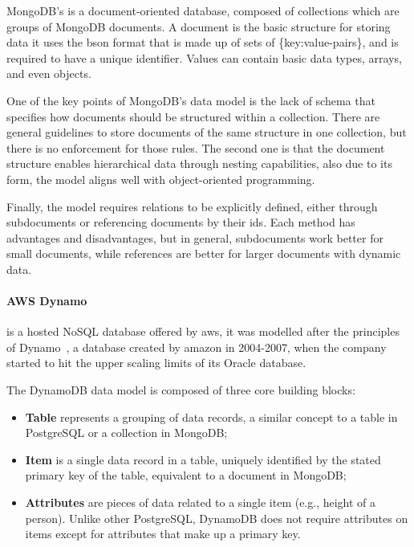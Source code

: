 MongoDB's is a document-oriented database, composed of collections which are groups of MongoDB documents. A document is the basic structure for storing data it uses the \acrshort{bson} format that is made up of sets of \{key:value-pairs\}, and is required to have a unique identifier. Values can contain basic data types, arrays, and even objects.

One of the key points of MongoDB's data model is the lack of schema that specifies how documents should be structured within a collection. There are general guidelines to store documents of the same structure in one collection, but there is no enforcement for those rules. 
The second one is that the document structure enables hierarchical data through nesting capabilities, also due to its form, the model aligns well with object-oriented programming.

Finally, the model requires relations to be explicitly defined, either through subdocuments or referencing documents by their ids. Each method has advantages and disadvantages, but in general, subdocuments work better for small documents, while references are better for larger documents with dynamic data.


\paragraph{AWS Dynamo} is a hosted NoSQL database offered by \acrfull{aws}, it was modelled after the principles of Dynamo~\cite{deCandia2007DynamoAH}, a database created by amazon in 2004-2007, when the company started to hit the upper scaling limits of its Oracle database.

The DynamoDB data model is composed of three core building blocks:

\begin{itemize}
    \item \textbf{Table} represents a grouping of data records, a similar concept to a table in PostgreSQL or a collection in MongoDB;
    \item \textbf{Item} is a single data record in a table, uniquely identified by the stated primary key of the table, equivalent to a document in MongoDB;
    \item \textbf{Attributes} are pieces of data related to a single item (e.g., height of a person). Unlike other PostgreSQL, DynamoDB does not require attributes on items except for attributes that make up a primary key.
\end{itemize}

